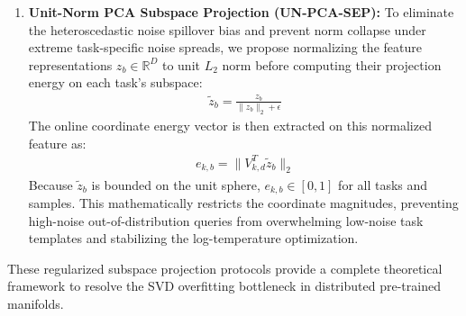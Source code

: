 \begin{enumerate}
    \begin{align}
        S_W &= \sum_{c=1}^{C_{\text{class}}} \sum_{i \in \mathcal{C}_{k, c}} (z_i - \mu_{k, c})(z_i - \mu_{k, c})^T \\
        S_B &= \sum_{c=1}^{C_{\text{class}}} N_{c} (\mu_{k, c} - \mu_k)(\mu_{k, c} - \mu_k)^T
    \end{align}
    where $\mu_{k, c}$ is the centroid of class $c$ in task $k$. The regularized LDA projection directions $V_{k, d}^{\text{LDA}}$ are solved as the generalized eigenvectors of:
    \begin{align}
        (S_W + \gamma I_D)^{-1} S_B V = V \Lambda
    \end{align}
    By actively maximizing the ratio of between-class signal variance to within-class noise variance, LDA-SEP mathematically filters out off-target heteroscedastic noise directions, ensuring robust coordinate extraction even under extreme noise.
    \item \textbf{Unit-Norm PCA Subspace Projection (UN-PCA-SEP):} To eliminate the heteroscedastic noise spillover bias and prevent norm collapse under extreme task-specific noise spreads, we propose normalizing the feature representations $z_b \in \mathbb{R}^D$ to unit $L_2$ norm before computing their projection energy on each task's subspace:
    \begin{align}
        \tilde{z}_b = \frac{z_b}{\|z_b\|_2 + \epsilon}
    \end{align}
    The online coordinate energy vector is then extracted on this normalized feature as:
    \begin{align}
        e_{k, b} = \|V_{k, d}^T \tilde{z}_b\|_2
    \end{align}
    Because $\tilde{z}_b$ is bounded on the unit sphere, $e_{k, b} \in [0, 1]$ for all tasks and samples. This mathematically restricts the coordinate magnitudes, preventing high-noise out-of-distribution queries from overwhelming low-noise task templates and stabilizing the log-temperature optimization.
\end{enumerate}
These regularized subspace projection protocols provide a complete theoretical framework to resolve the SVD overfitting bottleneck in distributed pre-trained manifolds.

